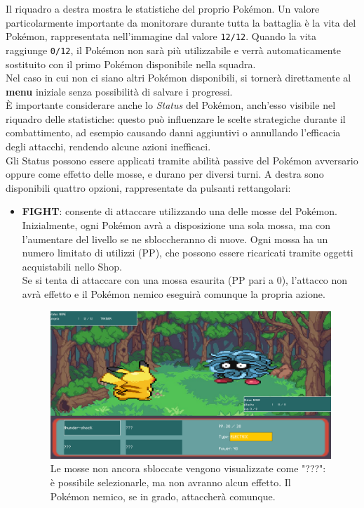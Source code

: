 \documentclass[a4paper,12pt]{report}
\begin{document}
{{Il riquadro a destra mostra le statistiche del proprio Pokémon. Un valore particolarmente importante da monitorare durante tutta la battaglia è la vita del Pokémon, rappresentata nell’immagine dal valore \texttt{12/12}. Quando la vita raggiunge \texttt{0/12}, il Pokémon non sarà più utilizzabile e verrà automaticamente sostituito con il primo Pokémon disponibile nella squadra.\\
Nel caso in cui non ci siano altri Pokémon disponibili, si tornerà direttamente al \textbf{menu} iniziale senza possibilità di salvare i progressi.\\
È importante considerare anche lo \textit{Status} del Pokémon, anch’esso visibile nel riquadro delle statistiche: questo può influenzare le scelte strategiche durante il combattimento, ad esempio causando danni aggiuntivi o annullando l’efficacia degli attacchi, rendendo alcune azioni inefficaci.\\
Gli Status possono essere applicati tramite abilità passive del Pokémon avversario oppure come effetto delle mosse, e durano per diversi turni.
A destra sono disponibili quattro opzioni, rappresentate da pulsanti rettangolari:
\begin{itemize}
  \item \textbf{FIGHT}: consente di attaccare utilizzando una delle mosse del Pokémon. Inizialmente, ogni Pokémon avrà a disposizione una sola mossa, ma con l’aumentare del livello se ne sbloccheranno di nuove. Ogni mossa ha un numero limitato di utilizzi (PP), che possono essere ricaricati tramite oggetti acquistabili nello Shop.\\
  Se si tenta di attaccare con una mossa esaurita (PP pari a 0), l’attacco non avrà effetto e il Pokémon nemico eseguirà comunque la propria azione.\\
  
  \begin{figure}[H]
    \centering
    \includegraphics[width=\textwidth]{immagini/moveImg.png}
    \caption{Le mosse non ancora sbloccate vengono visualizzate come "???": è possibile selezionarle, ma non avranno alcun effetto. Il Pokémon nemico, se in grado, attaccherà comunque.}
    \label{fig:move_display}
  \end{figure}


\end{itemize}}}
\end{document}

